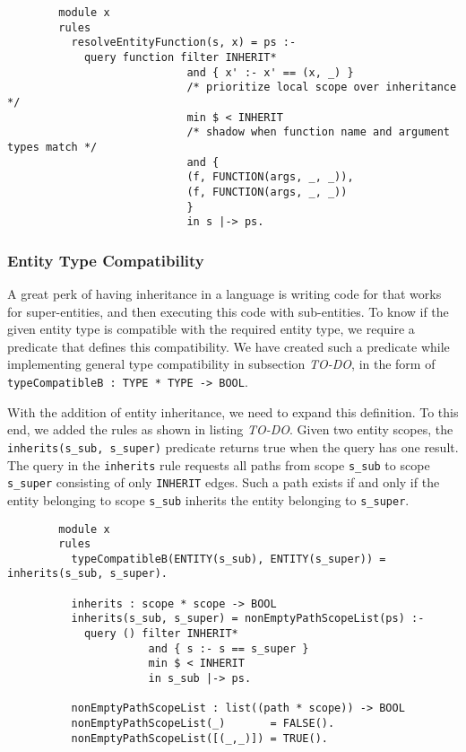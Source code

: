       \begin{verbatim}
        module x
        rules
          resolveEntityFunction(s, x) = ps :-
            query function filter INHERIT*
                            and { x' :- x' == (x, _) }
                            /* prioritize local scope over inheritance */
                            min $ < INHERIT
                            /* shadow when function name and argument types match */
                            and {
                            (f, FUNCTION(args, _, _)),
                            (f, FUNCTION(args, _, _))
                            }
                            in s |-> ps.
      \end{verbatim}

    \subsubsection{Entity Type Compatibility}
      A great perk of having inheritance in a language is writing code for that works for super-entities, and then executing this code with sub-entities. To know if the given entity type is compatible with the required entity type, we require a predicate that defines this compatibility. We have created such a predicate while implementing general type compatibility in subsection \emph{TO-DO}, in the form of \lstinline|typeCompatibleB : TYPE * TYPE -> BOOL|.

      With the addition of entity inheritance, we need to expand this definition. To this end, we added the rules as shown in listing \emph{TO-DO}. Given two entity scopes, the \lstinline|inherits(s_sub, s_super)| predicate returns true when the query has one result. The query in the \texttt{inherits} rule requests all paths from scope \texttt{s\_sub} to scope \texttt{s\_super} consisting of only \texttt{INHERIT} edges. Such a path exists if and only if the entity belonging to scope \texttt{s\_sub} inherits the entity belonging to \texttt{s\_super}.

      \begin{verbatim}
        module x
        rules
          typeCompatibleB(ENTITY(s_sub), ENTITY(s_super)) = inherits(s_sub, s_super).

          inherits : scope * scope -> BOOL
          inherits(s_sub, s_super) = nonEmptyPathScopeList(ps) :-
            query () filter INHERIT*
                      and { s :- s == s_super }
                      min $ < INHERIT
                      in s_sub |-> ps.

          nonEmptyPathScopeList : list((path * scope)) -> BOOL
          nonEmptyPathScopeList(_)       = FALSE().
          nonEmptyPathScopeList([(_,_)]) = TRUE().
      \end{verbatim}

